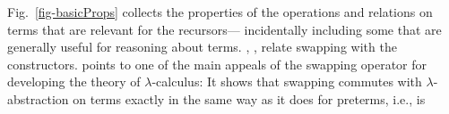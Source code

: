 %
%
%
%
Fig.~\ref{fig-basicProps} collects the properties of the operations and relations on terms that are relevant for the recursors---%
incidentally including some that are generally useful for reasoning about terms. %
%
\SwVr{}, \SwAp{}, \SwLm{} relate swapping with the  constructors.  
\SwLm{} points to one of the main appeals of the swapping operator for developing the theory of $\lambda$-calculus: It shows that swapping commutes with $\lambda$-abstraction on terms exactly in the same way as it does for preterms, i.e., is %
